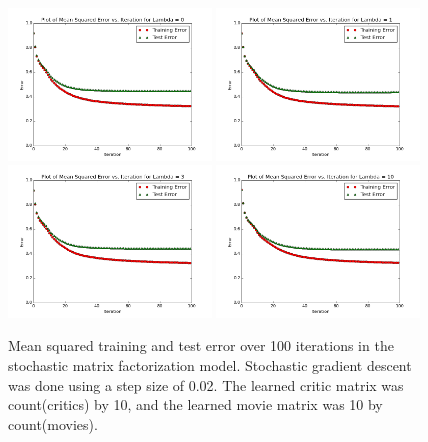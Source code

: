 \documentclass[12pt]{article}
\begin{document}
	\begin{figure}[H]
	\centering
	\includegraphics[width=0.48\textwidth]{plots/test-i100d10l0.png}
	\includegraphics[width=0.48\textwidth]{plots/test-i100d10l1.png}
	\includegraphics[width=0.48\textwidth]{plots/test-i100d10l3.png}
	\includegraphics[width=0.48\textwidth]{plots/test-i100d10l10.png}
	\caption{Mean squared training and test error over 100 iterations in the stochastic matrix factorization model. Stochastic gradient descent was done using a step size of 0.02. The learned critic matrix was count(critics) by 10, and the learned movie matrix was 10 by count(movies).}
	\label{fig:10}
	\end{figure}
\end{document}
